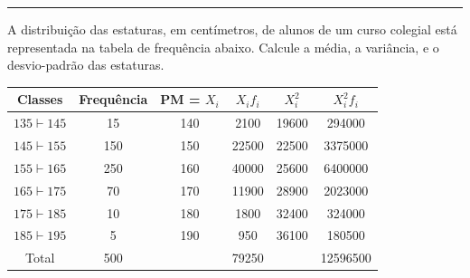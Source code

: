 \documentclass[a4paper,11pt,fleqn]{article}\usepackage[]{graphicx}\usepackage[]{color}
\theoremstyle{definition}
\begin{document}
\vspace{0.3cm}
\hrule
\vspace{0.3cm}

\begin{compactenum}[7.] %
\item A distribuição das estaturas, em centímetros, de alunos de um
  curso colegial está representada na tabela de frequência abaixo.
  Calcule a média, a variância, e o desvio-padrão das estaturas.
  \begin{table}[htbp]
    \begin{center}
      \begin{tabular}{cccccc}
        \hline
        Classes          & Frequência & PM = $X_i$ & $X_if_i$ & $X_i^2$ & $X_i^2f_i$ \\
        \hline
        $135 \vdash 145$ & 15         & 140        & 2100     & 19600   & 294000     \\
        $145 \vdash 155$ & 150        & 150        & 22500    & 22500   & 3375000    \\
        $155 \vdash 165$ & 250        & 160        & 40000    & 25600   & 6400000    \\
        $165 \vdash 175$ & 70         & 170        & 11900    & 28900   & 2023000    \\
        $175 \vdash 185$ & 10         & 180        & 1800     & 32400   & 324000     \\
        $185 \vdash 195$ & 5          & 190        & 950      & 36100   & 180500     \\
        \hline
        Total            & 500        &            & 79250    &         & 12596500   \\
        \hline
      \end{tabular}
    \end{center}
  \end{table}




\end{compactenum}
\end{document}
